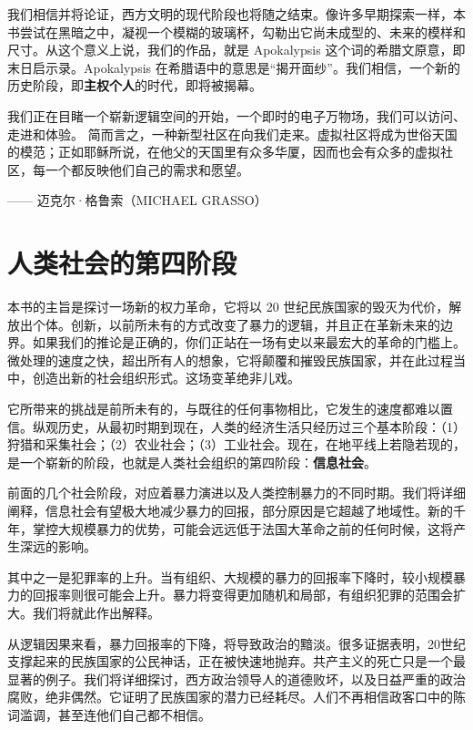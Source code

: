我们相信并将论证，西方文明的现代阶段也将随之结束。像许多早期探索一样，本书尝试在黑暗之中，凝视一个模糊的玻璃杯，勾勒出它尚未成型的、未来的模样和尺寸。从这个意义上说，我们的作品，就是 Apokalypsis 这个词的希腊文原意，即末日启示录。Apokalypsis 在希腊语中的意思是“揭开面纱”。我们相信，一个新的历史阶段，即\textbf{主权个人}的时代，即将被揭幕。


\begin{tcolorbox}
我们正在目睹一个崭新逻辑空间的开始，一个即时的电子万物场，我们可以访问、走进和体验。
简而言之，一种新型社区在向我们走来。虚拟社区将成为世俗天国的模范；正如耶稣所说，在他父的天国里有众多华厦，因而也会有众多的虚拟社区，每一个都反映他们自己的需求和愿望。
\begin{flushright}
—— 迈克尔·格鲁索（MICHAEL GRASSO）
\end{flushright}
\end{tcolorbox}

\section{人类社会的第四阶段}
本书的主旨是探讨一场新的权力革命，它将以 20 世纪民族国家的毁灭为代价，解放出个体。创新，以前所未有的方式改变了暴力的逻辑，并且正在革新未来的边界。如果我们的推论是正确的，你们正站在一场有史以来最宏大的革命的门槛上。微处理的速度之快，超出所有人的想象，它将颠覆和摧毁民族国家，并在此过程当中，创造出新的社会组织形式。这场变革绝非儿戏。


它所带来的挑战是前所未有的，与既往的任何事物相比，它发生的速度都难以置信。纵观历史，从最初时期到现在，人类的经济生活只经历过三个基本阶段：（1）狩猎和采集社会；（2）农业社会；（3）工业社会。现在，在地平线上若隐若现的，是一个崭新的阶段，也就是人类社会组织的第四阶段：\textbf{信息社会}。


前面的几个社会阶段，对应着暴力演进以及人类控制暴力的不同时期。我们将详细阐释，信息社会有望极大地减少暴力的回报，部分原因是它超越了地域性。新的千年，掌控大规模暴力的优势，可能会远远低于法国大革命之前的任何时候，这将产生深远的影响。

其中之一是犯罪率的上升。当有组织、大规模的暴力的回报率下降时，较小规模暴力的回报率则很可能会上升。暴力将变得更加随机和局部，有组织犯罪的范围会扩大。我们将就此作出解释。

从逻辑因果来看，暴力回报率的下降，将导致政治的黯淡。很多证据表明，20世纪支撑起来的民族国家的公民神话，正在被快速地抛弃。共产主义的死亡只是一个最显著的例子。我们将详细探讨，西方政治领导人的道德败坏，以及日益严重的政治腐败，绝非偶然。它证明了民族国家的潜力已经耗尽。人们不再相信政客口中的陈词滥调，甚至连他们自己都不相信。

